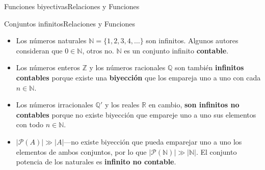 \documentclass[spanish]{beamer}
\begin{document}
\begin{frame}{Funciones biyectivas}{Relaciones y Funciones}
    \begin{center}
    \end{center}
\end{frame}

\begin{frame}{Conjuntos infinitos}{Relaciones y Funciones}
    \begin{itemize}
        \justifying
        \itemsep1.5em
        \item <1-> Los números \alert{naturales} $\mathbb{N} = \{1, 2, 3, 4, \dots\}$ son infinitos. Algunos autores consideran que $0 \in \mathbb{N}$, otros no. $\mathbb{N}$ es un conjunto infinito \textbf{contable}.
        \item <2-> Los números \alert{enteros} $\mathbb{Z}$ y los números \alert{racionales} $\mathbb{Q}$ son también \textbf{infinitos contables} porque existe una \textbf{biyección} que los empareja uno a uno con cada $n \in \mathbb{N}$.
        \item <3-> Los números \alert{irracionales} $\mathbb{Q}'$ y los \alert{reales} $\mathbb{R}$ en cambio, \textbf{son infinitos no contables} porque no existe biyección que empareje uno a uno sus elementos con todo $n \in \mathbb{N}$.
        \item <4-> $|\mathscr{P}(A)| \gg |A|$---no existe biyección que pueda emparejar uno a uno los elementos de ambos conjuntos, por lo que $|\mathscr{P}(\mathbb{N})| \gg |\mathbb{N}|$. El conjunto potencia de los naturales es \textbf{infinito no contable}.
    \end{itemize}
\end{frame}
\end{document}
